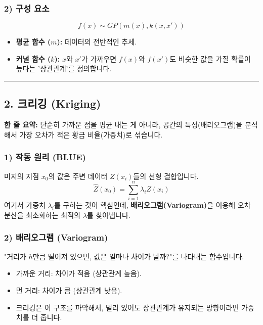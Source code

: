 \documentclass[11pt,a4paper]{book}
\theoremstyle{definition}
\begin{document}
\subsubsection*{2) 구성 요소}
$$ f(x) \sim GP(m(x), k(x, x')) $$
\begin{itemize}
    \item \textbf{평균 함수 ($m$):} 데이터의 전반적인 추세.
    \item \textbf{커널 함수 ($k$):} $x$와 $x'$가 가까우면 $f(x)$와 $f(x')$도 비슷한 값을 가질 확률이 높다는 '상관관계'를 정의합니다.
\end{itemize}

\vspace{0.5cm}\hrule\vspace{0.5cm}

\subsection{2. 크리깅 (Kriging)}


\begin{conceptbox}[title={개념 2: 지능적인 가중 평균}]
\textbf{한 줄 요약:} 단순히 가까운 점을 평균 내는 게 아니라, 공간의 특성(배리오그램)을 분석해서 가장 오차가 적은 황금 비율(가중치)로 섞습니다.
\end{conceptbox}

\subsubsection*{1) 작동 원리 (BLUE)}
미지의 지점 $x_0$의 값은 주변 데이터 $Z(x_i)$들의 선형 결합입니다.
$$ \hat{Z}(x_0) = \sum_{i=1}^{n} \lambda_i Z(x_i) $$
여기서 가중치 $\lambda_i$를 구하는 것이 핵심인데, \textbf{배리오그램(Variogram)}을 이용해 오차 분산을 최소화하는 최적의 $\lambda$를 찾아냅니다.

\subsubsection*{2) 배리오그램 (Variogram)}
"거리가 $h$만큼 떨어져 있으면, 값은 얼마나 차이가 날까?"를 나타내는 함수입니다.
\begin{itemize}
    \item 가까운 거리: 차이가 적음 (상관관계 높음).
    \item 먼 거리: 차이가 큼 (상관관계 낮음).
    \item 크리깅은 이 구조를 파악해서, 멀리 있어도 상관관계가 유지되는 방향이라면 가중치를 더 줍니다.
\end{itemize}
\end{document}

